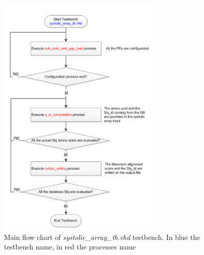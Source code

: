 \begin{figure}[h!]
	\centering
	\includegraphics[width=0.7\textwidth]{imm/sw/tb_flow.png} 	\caption{Main flow chart of \textit{systolic\_array\_tb.vhd} testbench. In blue the testbench name, in red the processes name} 
	\label{tb_sw_flow}
\end{figure}

\clearpage
\newpage

